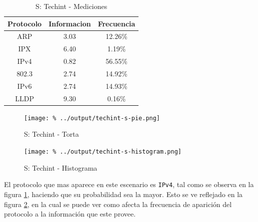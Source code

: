 \documentclass[final,inline,a4paper,narroweqnarray]{ieee}
\begin{document}
\begin{table}\begin{center}
    \begin{tabular}{|c|c|c|}
    \hline
    Protocolo & Informacion & Frecuencia \\ \hline
    ARP       & 3.03        & 12.26\%    \\ \hline
    IPX       & 6.40        & 1.19\%     \\ \hline
    IPv4      & 0.82        & 56.55\%    \\ \hline
    802.3     & 2.74        & 14.92\%    \\ \hline
    IPv6      & 2.74        & 14.93\%    \\ \hline
    LLDP      & 9.30        & 0.16\%     \\ \hline
   \end{tabular}
    \caption{S: Techint - Mediciones}
\end{center}\end{table}
    
    
    \begin{figure}[ht]\begin{center}
      \texttt{[image: \%
      ../output/techint-s-pie.png]}
      \vspace{-3em}
      \caption{S: Techint - Torta}
      \label{techint-s-pie}
    \end{center}\end{figure}
 
     
    \begin{figure}[ht]\begin{center}
      \texttt{[image: \%
      ../output/techint-s-histogram.png]}
      \caption{S: Techint - Histograma}
      \label{techint-s-histogram}
    \end{center}\end{figure}


    El protocolo que mas aparece en este escenario es \texttt{IPv4},
    tal como se observa en la figura \ref{techint-s-pie}, haciendo que
    su probabilidad sea la mayor. Esto se ve reflejado en la figura
    \ref{techint-s-histogram}, en la cual se puede ver como afecta la
    frecuencia de aparición del protocolo a la información que este
    provee.
\end{document}
